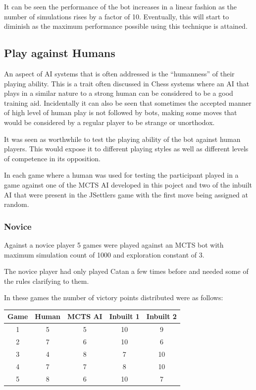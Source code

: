 \documentclass[]{article}
\begin{document}
\par It can be seen the performance of the bot increases in a linear fashion as the number of simulations rises by a factor of 10. Eventually, this will start to diminish as the maximum performance possible using this technique is attained.

\subsection{Play against Humans}
 
An aspect of AI systems that is often addressed is the ``humanness'' of their playing ability. This is a trait often discussed in Chess systems where an AI that plays in a similar nature to a strong human can be considered to be a good training aid. Incidentally it can also be seen that sometimes the accepted manner of high level of human play is not followed by bots, making some moves that would be considered by a regular player to be strange or unorthodox. 

\par It was seen as worthwhile to test the playing ability of the bot against human players. This would expose it to different playing styles as well as different levels of competence in its opposition. 

\par In each game where a human was used for testing the participant played in a game against one of the MCTS AI developed in this poject and two of the inbuilt AI that were present in the JSettlers game with the first move being assigned at random.

\subsubsection{Novice}
Against a novice player 5 games were played against an MCTS bot with maximum simulation count of 1000 and exploration constant of 3.

\par The novice player had only played Catan a few times before and needed some of the rules clarifying to them.

In these games the number of victory points distributed were as follows:

\begin{center}
\begin{tabular}{|c||c|c|c|c|}
\hline
Game & Human & MCTS AI & Inbuilt 1 & Inbuilt 2\\
\hline
1 & 5 & 5 & 10 & 9 \\
\hline
2 & 7 & 6 & 10 & 6 \\
\hline
3 & 4 & 8 & 7 & 10\\
\hline
4 & 7 & 7 & 8 & 10 \\
\hline
5 & 8 & 6 & 10 & 7 \\
\hline
\end{tabular}
\end{center}
\end{document}
